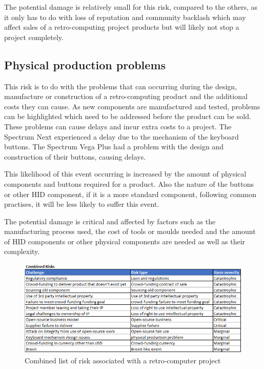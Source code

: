 The potential damage is relatively small for this risk, compared to the others, as it only has to do with loss of reputation and community backlash which may affect sales of a retro-computing project products but will likely not stop a project completely.  \\

\subsection{Physical production problems}
This risk is to do with the problems that can occurring during the design, manufacture or construction of a retro-computing product and the additional costs they can cause. As new components are manufactured and tested, problems can be highlighted which need to be addressed before the product can be sold. These problems can cause delays and incur extra costs to a project. The Spectrum Next experienced a delay due to the mechanism of the keyboard buttons. The Spectrum Vega Plus had a problem with the design and construction of their buttons, causing delays. 

This likelihood of this event occurring is increased by the amount of physical components and buttons required for a product. Also the nature of the buttons or other HID component, if it is a more standard component, following common practises, it will be less likely to suffer this event.

The potential damage is critical and affected by factors such as the manufacturing process used, the cost of tools or moulds needed and the amount of HID components or other physical components are needed as well as their complexity.\\ 

\begin{figure} \begin{center}
\includegraphics[width= 1\linewidth]{pics/risk_list} 
\end{center} 
\caption{Combined list of risk associated with a retro-computer project}
\label{risk list}
\end{figure} 
